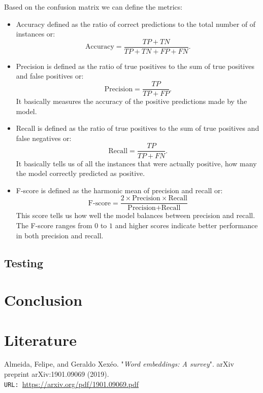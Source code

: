 \documentclass[12pt]{article}
\numberwithin{equation}{section}
\begin{document}
\begin{spacing}{1.5}
	Based on the confusion matrix we can define the metrics:
	\begin{itemize}
		\item Accuracy defined as the ratio of correct predictions to the total number of of instances or:
		$$ \text{Accuracy} = \frac{TP + TN}{TP + TN + FP + FN}. $$
		\item Precision is defined as the ratio of true positives to the sum of true positives and false positives or:
		$$ \text{Precision} = \frac{TP}{TP + FP}. $$
		It basically measures the accuracy of the positive predictions made by the model.
		\item Recall is defined as the ratio of true positives to the sum of true positives and false negatives or:
		$$ \text{Recall} = \frac{TP}{TP + FN}. $$
		It basically tells us of all the instances that were actually positive, how many the model correctly predicted as positive.
		\item F-score is defined as the harmonic mean of precision and recall or:
		$$ \text{F-score} = \frac{2 \times \text{Precision} \times \text{Recall}}{\text{Precision} + \text{Recall}} $$
		This score tells us how well the model balances between precision and recall. The F-score ranges from $0$ to $1$ and higher scores indicate better performance in both precision and recall.  
	\end{itemize}
	
	\subsection{Testing}
	
	\newpage
	\section{Conclusion}
	
	\newpage
	\section{Literature}
	
	\begin{thebibliography}{8}
		Almeida, Felipe, and Geraldo Xexéo. "\textit{Word embeddings: A survey}". arXiv preprint arXiv:1901.09069 (2019). \\
		\texttt{URL: }\url{https://arxiv.org/pdf/1901.09069.pdf}
		

\end{thebibliography}
\end{spacing}
\end{document}

